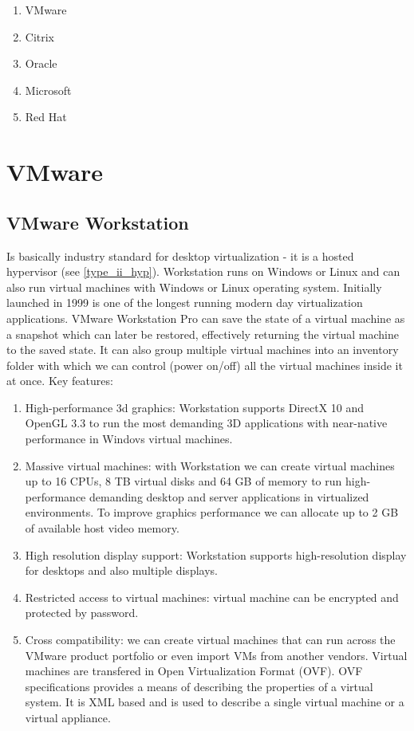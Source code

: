 \begin{enumerate}
\item VMware
\item Citrix
\item Oracle
\item Microsoft
\item Red Hat
\end{enumerate}

\section{VMware \cite{wmvare}}

\subsection{VMware Workstation}
Is basically industry standard for desktop virtualization - it is a hosted hypervisor (see \ref{type_ii_hyp}). Workstation runs on Windows or Linux and can also run virtual machines with Windows or Linux operating system. Initially launched in 1999 is one of the longest running modern day virtualization applications. VMware Workstation Pro can save the state of a virtual machine as a snapshot which can later be restored, effectively returning the virtual machine to the saved state. It can also group multiple virtual machines into an inventory folder with which we can control (power on/off) all the virtual machines inside it at once.
Key features:
\begin{enumerate}
\item High-performance 3d graphics: Workstation supports DirectX 10 and OpenGL 3.3 to run the most demanding 3D applications with near-native performance in Windovs virtual machines.
\item Massive virtual machines: with Workstation we can create virtual machines up to 16 CPUs, 8 TB virtual disks and 64 GB of memory to run high-performance demanding desktop and server applications in virtualized environments. To improve graphics performance we can allocate  up to 2 GB of available host video memory.
\item High resolution display support: Workstation supports high-resolution display for desktops and also multiple displays.
\item Restricted access to virtual machines: virtual machine can be encrypted and protected by password.
\item Cross compatibility: we can create virtual machines that can run across the VMware product portfolio or even import VMs from another vendors. Virtual machines are transfered in Open Virtualization Format (OVF). OVF specifications provides a means of describing the properties of a virtual system. It is XML based and is used to describe a single virtual machine or a virtual appliance.
\end{enumerate}

